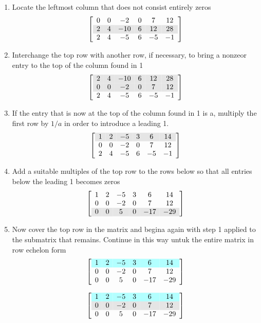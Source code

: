 \documentclass[a4paper, 12pt]{article}
\begin{document}
\begin{enumerate}
\item Locate the leftmost column that does not consist entirely zeros
\[ \left[ {\begin{array}{cccccc}
0 & 0 & -2  & 0 & 7 & 12 \\
\rowcolor{Gray}
2 & 4 & -10 & 6 & 12 & 28 \\
2 & 4 & -5 & 6 & -5 & -1
\end{array}} \right] \]
\item Interchange the top row with another row, if necessary, to bring 
a nonzeor entry to the top of the column found in 1
\[ \left[ {\begin{array}{cccccc}
\rowcolor{Gray}
2 & 4 & -10 & 6 & 12 & 28 \\
\rowcolor{Gray}
0 & 0 & -2  & 0 & 7 & 12 \\
2 & 4 & -5 & 6 & -5 & -1
\end{array}} \right] \]
\item If the entry that is now at the top of the column found in 1 is a,
multiply the first row by $1/a$ in order to introduce a leading 1.
\[ \left[ {\begin{array}{cccccc}
\rowcolor{Gray}
1 & 2 & -5 & 3 & 6 & 14 \\
0 & 0 & -2  & 0 & 7 & 12 \\
2 & 4 & -5 & 6 & -5 & -1
\end{array}} \right] \]
\item Add a suitable multiples of the top row to the rows below so that
all entries below the leading 1 becomes zeros
\[ \left[ {\begin{array}{cccccc}
1 & 2 & -5 & 3 & 6 & 14 \\
0 & 0 & -2  & 0 & 7 & 12 \\
\rowcolor{Gray}
0 & 0 & 5 & 0 & -17 & -29
\end{array}} \right] \]
\item Now cover the top row in the matrix and begina again with step 1
applied to the submatrix that remains. Continue in this way untuk the
entire matrix in row echelon form
\[ \left[ {\begin{array}{cccccc}
\rowcolor{LightCyan}
1 & 2 & -5 & 3 & 6 & 14 \\
0 & 0 & -2  & 0 & 7 & 12 \\
0 & 0 & 5 & 0 & -17 & -29
\end{array}} \right] \]

\[ \left[ {\begin{array}{cccccc}
\rowcolor{LightCyan}
1 & 2 & -5 & 3 & 6 & 14 \\
\rowcolor{Gray}
0 & 0 & -2  & 0 & 7 & 12 \\
0 & 0 & 5 & 0 & -17 & -29
\end{array}} \right] \]


\end{enumerate}
\end{document}
